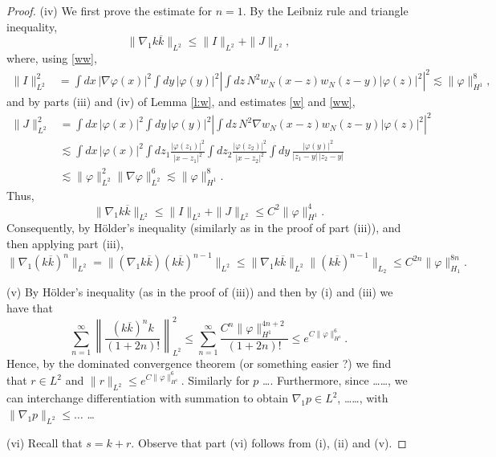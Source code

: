 \documentclass[11pt,a4paper]{scrartcl} %
\let\oldmarginpar\marginpar
\renewcommand\marginpar[1]{\-\oldmarginpar[\raggedleft\footnotesize #1]%
  {\raggedright\footnotesize #1}}
\begin{document}
\begin{proof}
  (iv) We first prove the estimate for $n=1$. By the Leibniz rule and triangle
  inequality,
  \[
    \| \nabla_1 k \overline{k} \|_{L^2} \le \| I \|_{L^2} + \| J \|_{L^2},
  \]
  where, using \eqref{ww},
  \begin{align*}
    \| I \|_{L^2}^2 & = \int dx \, |\nabla \varphi(x)|^2 \int dy \,
    |\varphi(y)|^2 \left| \int dz \, N^2 w_N(x-z) w_N(z-y) |\varphi(z)|^2
    \right|^2 \apprle \| \varphi \|_{H^1}^8,
  \end{align*}
  and by parts (iii) and (iv) of Lemma \ref{l:w}, and estimates \eqref{w} and
  \eqref{ww}, \begin{align*}
    \| J \|_{L^2}^2 & = \int dx \, |\varphi(x)|^2 \int dy \, |\varphi(y)|^2
    \left| \int dz \, N^2 \nabla w_N(x-z) w_N(z-y) |\varphi(z)|^2 \right|^2 \\
    & \apprle \int dx \, |\varphi(x)|^2 \int dz_1
    \frac{|\varphi(z_1)|^2}{|x-z_1|^2} \int dz_2
    \frac{|\varphi(z_2)|^2}{|x-z_2|^2} \int dy \,
    \frac{|\varphi(y)|^2}{|z_1-y| \, |z_2-y|} \\
    & \apprle \| \varphi \|_{L^2}^2 \| \nabla \varphi \|_{L^2}^6 \apprle \|
    \varphi \|_{H^1}^8.
  \end{align*}
  Thus,
  \[
    \| \nabla_1 k \overline{k} \|_{L^2} \le \| I \|_{L^2} + \| J \|_{L^2}
    \le C^2 \| \varphi \|_{H^1}^4.
  \]
  Consequently, by H\"older's inequality (similarly as in the proof of part
  (iii)), and then applying part (iii),
  \[
    \| \nabla_1 (k \overline{k})^n \|_{L^2} = \| (\nabla_1 k \overline{k}) (k
    \overline{k})^{n-1} \|_{L^2} \le \| \nabla_1 k \overline{k} \|_{L^2} \| (k
    \overline{k})^{n-1} \|_{L_2} \le C^{2n} \| \varphi \|_{H_1}^{8n}.
  \]


  \marginpar{Unfinished}
  (v) By H\"older's inequality (as in the proof of (iii)) and then by (i) and
  (iii) we have that
  \[
    \sum_{n=1}^\infty \left \| \frac{(k \overline{k})^n k}{(1+2n)!} \right
    \|_{L^2}^2 \le \sum_{n=1}^\infty \frac{C^n \| \varphi
    \|_{H^1}^{4n+2}}{(1+2n)!} \le e^{C \| \varphi \|_{H^1}^6}.
  \]
  Hence, by the dominated convergence theorem (or something easier ?) we find
  that $r \in L^2$ and $\| r \|_{L^2} \le e^{C \| \varphi \|_{H^1}^6}$.
  Similarly for $p$ \dots. Furthermore, since \dots \dots, we can interchange
  differentiation with summation to obtain $\nabla_1 p \in L^2$, \dots \dots,
  with $\| \nabla_1 p \|_{L^2} \le \dots$ \dots


  (vi) Recall that $s = k + r$. Observe that part (vi) follows from (i), (ii)
  and (v).
\end{proof}
\end{document}
